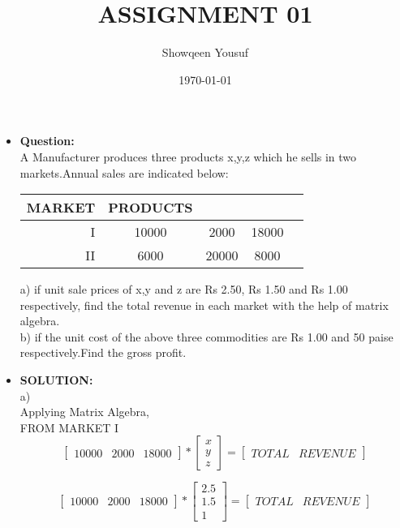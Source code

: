\documentclass{article}
\begin{document}
\title{ASSIGNMENT 01}
\author{Showqeen Yousuf}
\date{\today}
\maketitle

\begin{itemize}
\item{\textbf{Question:}}\\

A Manufacturer produces three products x,y,z which he sells in two markets.Annual sales are indicated below:\\

\begin{tabular}{rcccc}
MARKET &  PRODUCTS\\
\hline
I   & 10000 & 2000 & 18000\\
\hline
II  & 6000  & 20000 & 8000\\
\end{tabular}

a) if unit sale prices of x,y and z are Rs 2.50, Rs 1.50 and Rs 1.00 respectively, find the total revenue in each market with the help of matrix algebra.\\
b) if the unit cost of the above three commodities are Rs 1.00 and 50 paise respectively.Find the gross profit.\\
\newpage

\item{\textbf{SOLUTION:}}\\
a)\\

Applying Matrix Algebra,\\

FROM MARKET I\\
\[
\begin{bmatrix}
   10000 & 2000 & 18000            
 \end{bmatrix} 
      *
 \begin{bmatrix}
        x\\
        y\\
        z
 \end{bmatrix}
      = 
 \begin{bmatrix}
       TOTAL & REVENUE
 \end{bmatrix}
 
\]

\[
\begin{bmatrix}
   10000 & 2000 & 18000            
 \end{bmatrix} 
      *
 \begin{bmatrix}
        2.5\\
        1.5\\
        1
 \end{bmatrix}
      = 
 \begin{bmatrix}
       TOTAL & REVENUE
 \end{bmatrix}
 
\]
\end{itemize}
\end{document}
